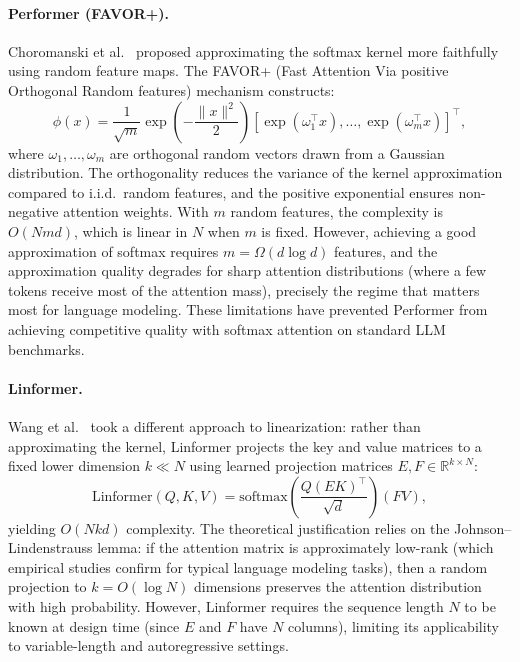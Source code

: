 \paragraph{Performer (FAVOR+).}
Choromanski et al.~\cite{choromanski2021rethinking} proposed approximating the softmax kernel more faithfully using random feature maps. The FAVOR+ (Fast Attention Via positive Orthogonal Random features) mechanism constructs:
\begin{equation}
\phi(x) = \frac{1}{\sqrt{m}} \exp\!\left(-\frac{\|x\|^2}{2}\right) \left[\exp(\omega_1^\top x), \ldots, \exp(\omega_m^\top x)\right]^\top,
\label{eq:favor}
\end{equation}
where $\omega_1, \ldots, \omega_m$ are orthogonal random vectors drawn from a Gaussian distribution. The orthogonality reduces the variance of the kernel approximation compared to i.i.d.\ random features, and the positive exponential ensures non-negative attention weights. With $m$ random features, the complexity is $O(Nmd)$, which is linear in $N$ when $m$ is fixed. However, achieving a good approximation of softmax requires $m = \Omega(d \log d)$ features, and the approximation quality degrades for sharp attention distributions (where a few tokens receive most of the attention mass), precisely the regime that matters most for language modeling. These limitations have prevented Performer from achieving competitive quality with softmax attention on standard LLM benchmarks.

\paragraph{Linformer.}
Wang et al.~\cite{wang2020linformer} took a different approach to linearization: rather than approximating the kernel, Linformer projects the key and value matrices to a fixed lower dimension $k \ll N$ using learned projection matrices $E, F \in \mathbb{R}^{k \times N}$:
\begin{equation}
\text{Linformer}(Q, K, V) = \text{softmax}\!\left(\frac{Q (EK)^\top}{\sqrt{d}}\right) (FV),
\label{eq:linformer}
\end{equation}
yielding $O(Nkd)$ complexity. The theoretical justification relies on the Johnson--Lindenstrauss lemma: if the attention matrix is approximately low-rank (which empirical studies confirm for typical language modeling tasks), then a random projection to $k = O(\log N)$ dimensions preserves the attention distribution with high probability. However, Linformer requires the sequence length $N$ to be known at design time (since $E$ and $F$ have $N$ columns), limiting its applicability to variable-length and autoregressive settings.

